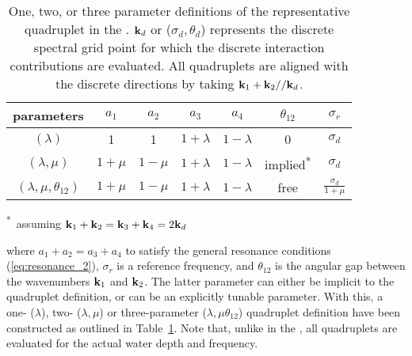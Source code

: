 \begin{table}
\caption{One, two, or three parameter definitions of the representative
         quadruplet in the \gmd. $\mbox{\bf k}_d$ or ($\sigma_d, \theta_d$) represents
         the discrete spectral grid point for which the discrete interaction
         contributions are evaluated. All quadruplets are aligned with the
         discrete directions by taking $\mbox{\bf k}_1 + \mbox{\bf k}_2 // \mbox{\bf k}_d$.}
  \label{tab:gmd_quad_def}
\vspace{\baselineskip}
\begin{center}
\begin{tabular}{ccccccc} \hline
 parameters  & $a_1$ & $a_2$ & $a_3$  & $a_4$ & $\theta_{12}$ &
 $\sigma_r$  \\ \hline
$(\lambda)$
    &    1    &    1    & $1+\lambda$  & $1-\lambda$ &    0  & $\sigma_d$ \\
$(\lambda, \mu)$
    & $1+\mu$ & $1-\mu$ & $1+\lambda$ & $1-\lambda$  &
                                   implied\textsuperscript{*}& $\sigma_d$ \\
$(\lambda, \mu, \theta_{12})$
    & $1+\mu$ & $1-\mu$ & $1+\lambda$ & $1-\lambda$  & free  &
                                                 $\frac{\sigma_d}{1+\mu}$ \\
\hline
\end{tabular}
\end{center}
\hspace{55mm} \textsuperscript{*}~assuming $\mbox{\bf k}_1 + \mbox{\bf k}_2 = \mbox{\bf k}_3 + \mbox{\bf k}_4 =
2\mbox{\bf k}_d$ 
\vspace{\baselineskip}
\botline
\end{table}

\noindent 
where $a_1 + a_2 = a_3 + a_4$ to satisfy the general resonance conditions
(\ref{eq:resonance_2}), $\sigma_r$ is a reference frequency, and $\theta_{12}$
is the angular gap between the wavenumbers $\mbox{\bf k}_1$ and $\mbox{\bf k}_2$. The latter
parameter can either be implicit to the quadruplet definition, or can be an
explicitly tunable parameter. With this, a one- ($\lambda$), two- ($\lambda,
\mu$) or three-parameter ($\lambda, \mu \theta_{12}$) quadruplet definition
have been constructed as outlined in Table~\ref{tab:gmd_quad_def}. Note that,
unlike in the \dia, all quadruplets are evaluated for the actual water depth
and frequency.

